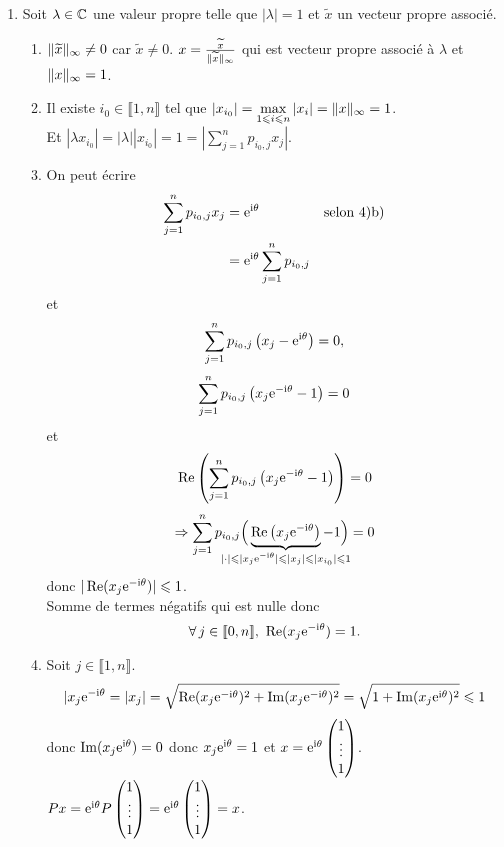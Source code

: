 \begin{solution}
\begin{enumerate}
        \item Soit $\lambda \in \mathbb{C}$ une valeur propre telle que $|\lambda| = 1$ et $\widetilde{x}$ un vecteur propre associé.
        \begin{enumerate}
            \item $\Vert \widetilde{x} \Vert_\infty \not= 0$ car $\widetilde{x} \not= 0$. 
            $x = \frac{\widetilde{x}}{\Vert \widetilde{x} \Vert_\infty}$ qui est vecteur propre associé à $\lambda$ et $\Vert x \Vert_\infty = 1$.
            \item Il existe $i_0 \in \llbracket 1, n \rrbracket$ tel que $|x_{i_0}| = \max\limits_{1 \leqslant i \leqslant n} |x_i| = \Vert x \Vert_\infty = 1$. \\
            Et $|\lambda x_{i_0}| = |\lambda||x_{i_0}| = 1 = \left| \sum\limits_{j=1}^n p_{i_0, j} x_j \right|$.
            \item On peut écrire
            \begin{align*}
                \sum_{j=1}^n p_{i_0, j} x_j &= \mathrm{e}^{\mathrm{i} \theta} & \text{selon 4)b)} \\
                &= \mathrm{e}^{\mathrm{i} \theta} \sum_{j=1}^n p_{i_0, j} &
            \end{align*}
            et
            $$\sum_{j=1}^n p_{i_0, j} \left( x_j - \mathrm{e}^{\mathrm{i} \theta} \right) = 0,$$
            $$\sum_{j=1}^n p_{i_0, j} \left( x_j \mathrm{e}^{-\mathrm{i} \theta} - 1 \right) = 0$$
            et
            $$\operatorname{\mathrm{Re}} \left( \sum_{j=1}^n p_{i_0, j} \left( x_j \mathrm{e}^{- \mathrm{i} \theta} - 1 \right) \right) = 0$$
            $$\Rightarrow \sum_{j=1}^n p_{i_0, j} \Big( \underbrace{\Reel \big(x_j \e^{- \i \theta} \big)}_{\mathclap{|\cdot| \leqslant |x_j \e^{-\i \theta}| \leqslant |x_j| \leqslant |x_{i_0}| \leqslant 1}} - 1 \Big) = 0$$
            donc $|\operatorname{\mathrm{Re}}(x_j \mathrm{e}^{- \mathrm{i} \theta}) | \leqslant 1$. \\
            Somme de termes négatifs qui est nulle donc
            $$\forall j \in \llbracket 0, n \rrbracket,\ \Reel(x_j \e^{- \i \theta}) = 1.$$
            \item Soit $j \in \llbracket 1, n \rrbracket$.
            $$|x_j \mathrm{e}^{-\mathrm{i} \theta} = |x_j| = \sqrt{ \operatorname{\mathrm{Re}} (x_j \mathrm{e}^{- \mathrm{i} \theta})^2 + \Im(x_j \mathrm{e}^{- \mathrm{i} \theta})^2 } = \sqrt{1 + \Im(x_j \mathrm{e}^{\mathrm{i} \theta})^2} \leqslant 1$$
            donc $\Im(x_j \mathrm{e}^{\mathrm{i} \theta}) = 0$ donc $x_j \mathrm{e}^{\mathrm{i} \theta} = 1$ et $x = \mathrm{e}^{\mathrm{i} \theta} \begin{pmatrix}1 \\ \vdots \\ 1\end{pmatrix}$. $Px = \mathrm{e}^{\mathrm{i} \theta} P \begin{pmatrix}1 \\ \vdots \\ 1\end{pmatrix} = \mathrm{e}^{\mathrm{i} \theta} \begin{pmatrix}1 \\ \vdots \\ 1\end{pmatrix} = x$. 
        \end{enumerate}
    \end{enumerate}
\end{solution}
